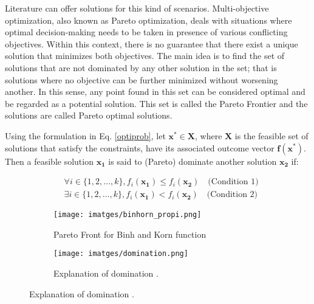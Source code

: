 \documentclass[a4paper,11pt, titlepage, twoside]{article}
\begin{document}
Literature can offer solutions for this kind of scenarios. Multi-objective optimization, also known as Pareto optimization, deals with situations where optimal decision-making
needs to be taken in presence of various conflicting objectives.  Within this context, there is no guarantee that there exist a unique solution that minimizes both objectives.
The main idea is to find the set of solutions that are not dominated by any other solution in the set; that is solutions where no objective can be further minimized without worsening another. In this sense, any point found in this set can be considered optimal 
and be regarded as a potential solution. This set is called the Pareto Frontier and the solutions are called Pareto optimal solutions.\par

Using the formulation in Eq. \ref{optiprob}, let $ \mathbf{x^*} \in \mathbf{X}$, where $\mathbf{X}$ is the feasible set of solutions that satisfy the constraints, have its associated outcome vector $\mathbf{f}(\mathbf{x^*})$.
Then a feasible solution $\mathbf{x_1}$ is said to (Pareto) dominate another solution $\mathbf{x_2}$ \cite{nsgai} if: 

\begin{equation} \label{paretodomination}
\begin{split}
    & \forall i \in \{1, 2, ..., k\}, f_i(\mathbf{x_1}) \leq f_i(\mathbf{x_2}) \quad \text{(Condition 1)} \\
    & \exists i \in \{1, 2, ..., k\}, f_i(\mathbf{x_1}) < f_i(\mathbf{x_2}) \quad \text{(Condition 2)}
\end{split}    
\end{equation}


\begin{figure}[H]
    \centering
    \begin{subfigure}{0.45\textwidth}
        \centering
        \texttt{[image: imatges/binhorn\_propi.png]}
        \caption{Pareto Front for Binh and Korn function}
        \label{fig:paretobinhorn}
    \end{subfigure}\hfill
    \begin{subfigure}{0.45\textwidth}
        \centering
        \texttt{[image: imatges/domination.png]}
        \caption{Explanation of domination \cite{domination}.}
        \label{fig:domination}
    \end{subfigure}
    \label{fig:both_images}
\end{figure}
\end{document}
